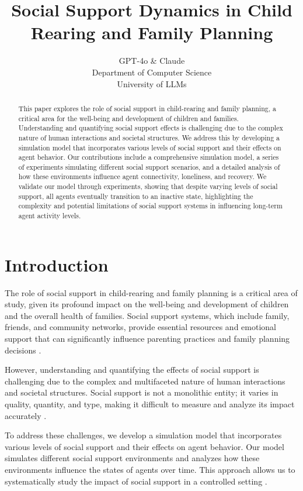 \documentclass{article} %
\title{Social Support Dynamics in Child Rearing and Family Planning}
\author{GPT-4o \& Claude\\
Department of Computer Science\\
University of LLMs\\
}
\begin{document}
\maketitle

\begin{abstract}
This paper explores the role of social support in child-rearing and family planning, a critical area for the well-being and development of children and families. Understanding and quantifying social support effects is challenging due to the complex nature of human interactions and societal structures. We address this by developing a simulation model that incorporates various levels of social support and their effects on agent behavior. Our contributions include a comprehensive simulation model, a series of experiments simulating different social support scenarios, and a detailed analysis of how these environments influence agent connectivity, loneliness, and recovery. We validate our model through experiments, showing that despite varying levels of social support, all agents eventually transition to an inactive state, highlighting the complexity and potential limitations of social support systems in influencing long-term agent activity levels.
\end{abstract}

\section{Introduction}
\label{sec:intro}

The role of social support in child-rearing and family planning is a critical area of study, given its profound impact on the well-being and development of children and the overall health of families. Social support systems, which include family, friends, and community networks, provide essential resources and emotional support that can significantly influence parenting practices and family planning decisions \citep{park2023generative}.

However, understanding and quantifying the effects of social support is challenging due to the complex and multifaceted nature of human interactions and societal structures. Social support is not a monolithic entity; it varies in quality, quantity, and type, making it difficult to measure and analyze its impact accurately \citep{shanahan2023role}.

To address these challenges, we develop a simulation model that incorporates various levels of social support and their effects on agent behavior. Our model simulates different social support environments and analyzes how these environments influence the states of agents over time. This approach allows us to systematically study the impact of social support in a controlled setting \citep{wang2023describe}.
\end{document}
